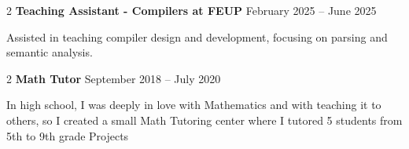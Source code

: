 \documentclass[10pt, letterpaper]{article}
\newenvironment{twocolentry}[2][]{
        \onecolentry
        \def\secondColumn{#2}
        \setcolumnwidth{\fill, 6.5cm}
        \begin{paracol}{2}
    }{
        \switchcolumn \raggedleft \secondColumn
        \end{paracol}
        \endonecolentry
    } %
\begin{document}
\vspace{0.2 cm}
\begin{twocolentry}{February 2025 – June 2025}\textbf{Teaching Assistant - Compilers at FEUP} \end{twocolentry}\vspace{0.10 cm}Assisted in teaching compiler design and development, focusing on parsing and semantic analysis.
\vspace{0.2 cm}
\begin{twocolentry}{September 2018 – July 2020}\textbf{Math Tutor} \end{twocolentry}\vspace{0.10 cm}In high school, I was deeply in love with Mathematics and with teaching it to others, so I created a small Math  Tutoring center where I tutored 5 students from 5th to 9th grade  Projects
\vspace{0.2 cm}
\end{document}
